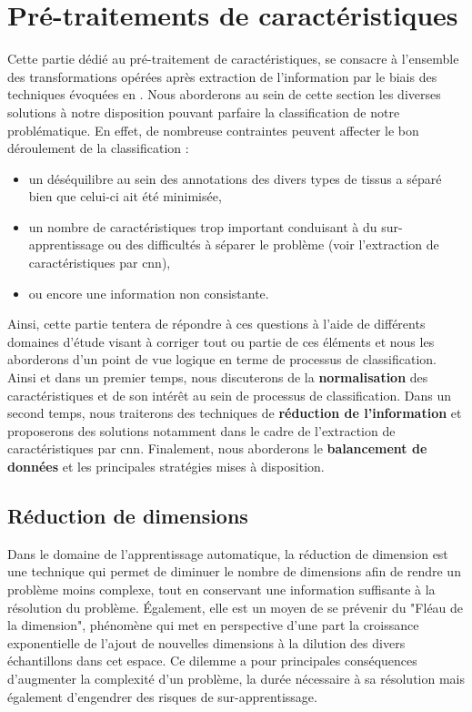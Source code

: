 \clearpage


\section{Pré-traitements de caractéristiques}
Cette partie dédié au pré-traitement de caractéristiques, se consacre à l'ensemble des transformations opérées après extraction de l'information par le biais des techniques évoquées en . Nous aborderons au sein de cette section les diverses solutions à notre disposition pouvant parfaire la classification de notre problématique. En effet, de nombreuse contraintes peuvent affecter le bon déroulement de la classification :
\begin{itemize}
    \item un déséquilibre au sein des annotations des divers types de tissus a séparé bien que celui-ci ait été minimisée,
    \item un nombre de caractéristiques trop important conduisant à du sur-apprentissage ou des difficultés à séparer le problème (voir l'extraction de caractéristiques par \gls{cnn}),
    \item ou encore une information non consistante.
\end{itemize}\par

Ainsi, cette partie tentera de répondre à ces questions à l'aide de différents domaines d'étude visant à corriger tout ou partie de ces éléments et nous les aborderons d'un point de vue logique en terme de processus de classification. Ainsi et dans un premier temps, nous discuterons de la \textbf{normalisation} des caractéristiques et de son intérêt au sein de processus de classification. Dans un second temps, nous traiterons des techniques de \textbf{réduction de l'information} et proposerons des solutions notamment dans le cadre de l'extraction de caractéristiques par \gls{cnn}. Finalement, nous aborderons le \textbf{balancement de données} et les principales stratégies mises à disposition.

\subsection{Réduction de dimensions}
Dans le domaine de l'apprentissage automatique, la réduction de dimension est une technique qui permet de diminuer le nombre de dimensions afin de rendre un problème moins complexe, tout en conservant une information suffisante à la résolution du problème. Également, elle est un moyen de se prévenir du "Fléau de la dimension", phénomène qui met en perspective d'une part la croissance exponentielle de l'ajout de nouvelles dimensions à la dilution des divers échantillons dans cet espace. Ce dilemme a pour principales conséquences d'augmenter la complexité d'un problème, la durée nécessaire à sa résolution mais également d'engendrer des risques de sur-apprentissage.\par

